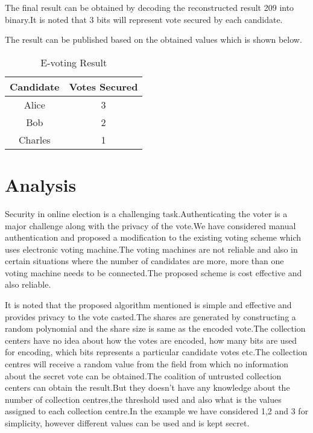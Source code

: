 \documentclass[conference]{IEEEtran}
\begin{document}
The final result can be obtained by decoding the reconstructed result 209 into
binary.It is noted that 3 bits will represent vote secured by each candidate.



The result can be published based on the obtained values which is shown below.

\begin{table}[ht]
	\small
	\caption{E-voting Result}
\centering
	\begin{tabular}{|c|c|} \hline
		 \textbf{Candidate}	& \textbf{Votes Secured} \\
		\hline
		Alice & 3 \\
		\hline
		Bob &   2 \\
		\hline
		Charles & 1 \\
		\hline
	\end{tabular} 
\end{table}

\section{Analysis}

Security in online election is a challenging task.Authenticating the voter is a major challenge along with the privacy of the vote.We have considered manual authentication and proposed a modification to the existing voting scheme which uses electronic voting machine.The voting machines are not reliable and also in certain situations where the number of candidates are more, more than one voting machine needs to be connected.The proposed scheme is cost effective and also reliable.

It is noted that the proposed algorithm mentioned is simple and effective and provides privacy to the vote casted.The shares are generated  by constructing a random polynomial and the share size is same as the encoded vote.The collection centers have no idea about how the votes are encoded, how many bits are used for encoding, which bits represents a particular candidate votes etc.The collection centres will receive a random value from the field  from which no information about the secret vote can be obtained.The coalition of  untrusted collection centers can obtain the result.But they doesn't have any knowledge about the number of collection centres,the threshold used and also what is the  values assigned to each collection centre.In the example we have considered 1,2 and 3 for simplicity, however different  values can be used and is kept secret.
\end{document}
